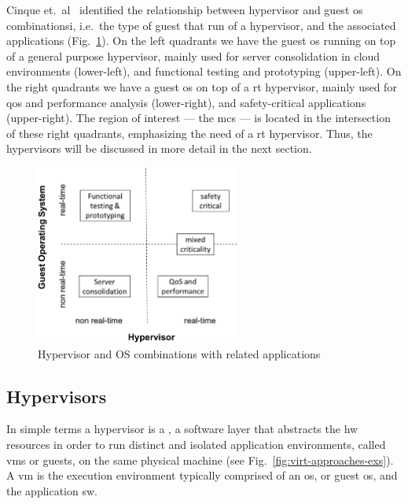 Cinque et.~al~\cite{cinque2022virtualizing} identified the relationship between hypervisor and guest
\gls{os} combinationsi, i.e.~the type of guest that run of a hypervisor, and the
associated applications (Fig.~\ref{fig:virt-combos}).
On the left quadrants we have the guest \gls{os} running on top of a general
purpose hypervisor, mainly used for server consolidation in cloud environments
(lower-left), and functional testing and prototyping (upper-left).
On the right quadrants we have a guest \gls{os} on top of a \gls{rt} hypervisor,
mainly used for \gls{qos} and performance analysis (lower-right), and
safety-critical applications (upper-right). The region of interest --- the
\gls{mcs} --- is located in the intersection of these right quadrants,
emphasizing the need of a \gls{rt} hypervisor. Thus, the hypervisors will be
discussed in more detail in the next section.

\begin{figure}[!hbt]
  \centering
  \includegraphics[width=0.6\textwidth]{./img/jpg/virt-combos} 
%   
  \caption[Hypervisor and OS combinations with related applications]{Hypervisor
    and OS combinations with related applications~\cite{cinque2022virtualizing}\footnotemark}%
  \label{fig:virt-combos}
\end{figure}
%
%

\subsection{Hypervisors}%
\label{sec:superv--hyperv}
In simple terms a hypervisor is a , a software layer that
abstracts the \gls{hw} resources in order to run distinct and isolated
application environments, called \glspl{vm} or guests, on the same physical
machine (see Fig.~\ref{fig:virt-approaches-exs}). A \gls{vm} is the execution environment typically comprised of an
\gls{os}, or guest \gls{os}, and the application \gls{sw}.

